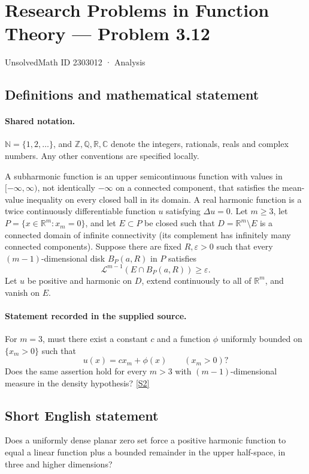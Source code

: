 \documentclass[11pt]{article}
\newcommand{\sref}[2]{\hyperlink{source:#1:#2}{[S#2]}}
\begin{document}
\setcounter{section}{2303011}
\section{Research Problems in Function Theory — Problem 3.12}\label{2303012}
{\small\sffamily UnsolvedMath ID 2303012 · Analysis}
\subsection{Definitions and mathematical statement}

\paragraph{Shared notation.}$\mathbb N=\{1,2,\ldots\}$, and $\mathbb Z,\mathbb Q,\mathbb R,\mathbb C$ denote the integers, rationals, reals and complex numbers. Any other conventions are specified locally.


A subharmonic function is an upper semicontinuous function with values in $[-\infty,\infty)$, not identically $-\infty$ on a connected component, that satisfies the mean-value inequality on every closed ball in its domain. A real harmonic function is a twice continuously differentiable function $u$ satisfying $\Delta u=0$. Let $m\geq3$, let $P=\{x\in\mathbb R^m:x_m=0\}$, and let $E\subset P$ be closed such that $D=\mathbb R^m\setminus E$ is a connected domain of infinite connectivity (its complement has infinitely many connected components). Suppose there are fixed $R,\varepsilon>0$ such that every $(m-1)$-dimensional disk $B_P(a,R)$ in $P$ satisfies
\[\mathcal L^{m-1}(E\cap B_P(a,R))\geq\varepsilon.\]
Let $u$ be positive and harmonic on $D$, extend continuously to all of $\mathbb R^m$, and vanish on $E$.
\paragraph{Statement recorded in the supplied source.}
For $m=3$, must there exist a constant $c$ and a function $\phi$ uniformly bounded on $\{x_m>0\}$ such that
\[u(x)=c x_m+\phi(x)\qquad(x_m>0)?\]
Does the same assertion hold for every $m>3$ with $(m-1)$-dimensional measure in the density hypothesis? \sref{2303012}{2}
\subsection{Short English statement}
Does a uniformly dense planar zero set force a positive harmonic function to equal a linear function plus a bounded remainder in the upper half-space, in three and higher dimensions?
\end{document}
